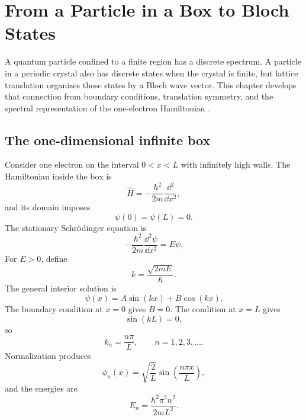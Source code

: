 \chapter{From a Particle in a Box to Bloch States}
\label{ch:particle-box-to-bloch}

A quantum particle confined to a finite region has a discrete spectrum.  A
particle in a periodic crystal also has discrete states when the crystal is
finite, but lattice translation organizes those states by a Bloch wave vector.
This chapter develops that connection from boundary conditions, translation
symmetry, and the spectral representation of the one-electron Hamiltonian
\cite{kittel2005,yu2010,rudan2015}.

\section{The one-dimensional infinite box}

Consider one electron on the interval $0<x<L$ with infinitely high walls.  The
Hamiltonian inside the box is
\begin{equation}
  \hat H
  =-\frac{\hbar^2}{2m}\frac{\dd^2}{\dd x^2},
  \label{eq:box-hamiltonian}
\end{equation}
and its domain imposes
\begin{equation}
  \psi(0)=\psi(L)=0.
  \label{eq:box-dirichlet-boundary-conditions}
\end{equation}
The stationary Schrödinger equation is
\begin{equation}
  -\frac{\hbar^2}{2m}\frac{\dd^2\psi}{\dd x^2}
  =E\psi.
  \label{eq:box-stationary-schrodinger}
\end{equation}
For $E>0$, define
\begin{equation}
  k=\frac{\sqrt{2mE}}{\hbar}.
  \label{eq:box-wave-number-energy}
\end{equation}
The general interior solution is
\begin{equation}
  \psi(x)=A\sin(kx)+B\cos(kx).
  \label{eq:box-general-solution}
\end{equation}
The boundary condition at $x=0$ gives $B=0$.  The condition at $x=L$ gives
\begin{equation}
  \sin(kL)=0,
  \label{eq:box-quantization-condition}
\end{equation}
so
\begin{equation}
  k_n=\frac{n\pi}{L},
  \qquad n=1,2,3,\ldots.
  \label{eq:box-allowed-wave-numbers}
\end{equation}
Normalization produces
\begin{equation}
  \boxed{
  \phi_n(x)=\sqrt{\frac{2}{L}}
  \sin\left(\frac{n\pi x}{L}\right),
  }
  \label{eq:box-normalized-eigenfunctions}
\end{equation}
and the energies are
\begin{equation}
  \boxed{
  E_n=\frac{\hbar^2\pi^2n^2}{2mL^2}.
  }
  \label{eq:box-energy-spectrum}
\end{equation}


